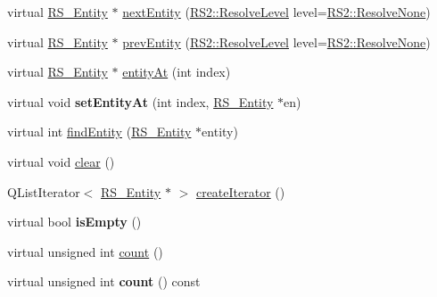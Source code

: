 \begin{DoxyCompactItemize}
\item 
virtual \hyperlink{classRS__Entity}{R\-S\-\_\-\-Entity} $\ast$ \hyperlink{classRS__EntityContainer_a5922d1accba1fa133080dbe9e220232c}{next\-Entity} (\hyperlink{classRS2_a1b2c5e3a3e9d1b03a9564229255faa20}{R\-S2\-::\-Resolve\-Level} level=\hyperlink{classRS2_a1b2c5e3a3e9d1b03a9564229255faa20aecb7396f39bc313ad8903c8a5fac5a50}{R\-S2\-::\-Resolve\-None})
\item 
virtual \hyperlink{classRS__Entity}{R\-S\-\_\-\-Entity} $\ast$ \hyperlink{classRS__EntityContainer_af86f3019dd0af8df69f742a79f6f426f}{prev\-Entity} (\hyperlink{classRS2_a1b2c5e3a3e9d1b03a9564229255faa20}{R\-S2\-::\-Resolve\-Level} level=\hyperlink{classRS2_a1b2c5e3a3e9d1b03a9564229255faa20aecb7396f39bc313ad8903c8a5fac5a50}{R\-S2\-::\-Resolve\-None})
\item 
virtual \hyperlink{classRS__Entity}{R\-S\-\_\-\-Entity} $\ast$ \hyperlink{classRS__EntityContainer_ac9d86ce5f50ae407d297fc88cf8244f8}{entity\-At} (int index)
\item 
\hypertarget{classRS__EntityContainer_a33c6bb59294d30e0ae68be195fae8184}{virtual void {\bfseries set\-Entity\-At} (int index, \hyperlink{classRS__Entity}{R\-S\-\_\-\-Entity} $\ast$en)}\label{classRS__EntityContainer_a33c6bb59294d30e0ae68be195fae8184}

\item 
virtual int \hyperlink{classRS__EntityContainer_ac431006414569dff86b1851b933de2bd}{find\-Entity} (\hyperlink{classRS__Entity}{R\-S\-\_\-\-Entity} $\ast$entity)
\item 
virtual void \hyperlink{classRS__EntityContainer_a772bc2c47d8c9c7cee975a062ce6a713}{clear} ()
\item 
Q\-List\-Iterator$<$ \hyperlink{classRS__Entity}{R\-S\-\_\-\-Entity} $\ast$ $>$ \hyperlink{classRS__EntityContainer_af63a6e7eef2a0a1ccf7ec6619418cd7e}{create\-Iterator} ()
\item 
\hypertarget{classRS__EntityContainer_a5e7e066dd240e9a41383cfb01357b506}{virtual bool {\bfseries is\-Empty} ()}\label{classRS__EntityContainer_a5e7e066dd240e9a41383cfb01357b506}

\item 
virtual unsigned int \hyperlink{classRS__EntityContainer_a22baa6bcd7d15000928c9530c45765f7}{count} ()
\item 
\hypertarget{classRS__EntityContainer_a2b13fd919ed38963b6c136276c466d45}{virtual unsigned int {\bfseries count} () const }\label{classRS__EntityContainer_a2b13fd919ed38963b6c136276c466d45}


\end{DoxyCompactItemize}
